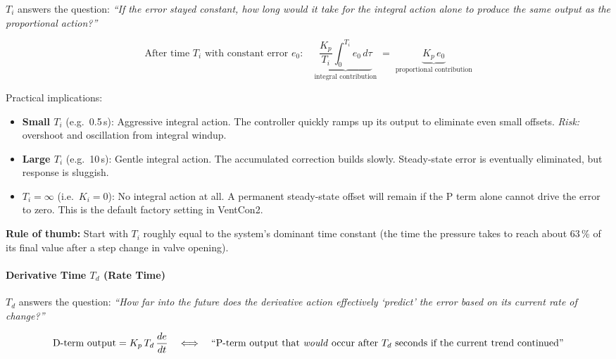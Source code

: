 \documentclass[12pt,a4paper]{article}
\begin{document}
$T_i$ answers the question: \emph{``If the error stayed constant, how long would it take for the integral action alone to produce the same output as the proportional action?''}

\begin{equation}
    \text{After time } T_i \text{ with constant error } e_0: \quad
    \underbrace{\frac{K_p}{T_i}\!\int_0^{T_i} e_0 \, d\tau}_{\text{integral contribution}} \;=\;
    \underbrace{K_p \, e_0}_{\text{proportional contribution}}
\end{equation}

\noindent
Practical implications:
\begin{itemize}
    \item \textbf{Small $T_i$} (e.g.\ 0.5\,s): Aggressive integral action. The controller quickly ramps up its output to eliminate even small offsets. \emph{Risk:} overshoot and oscillation from integral windup.
    \item \textbf{Large $T_i$} (e.g.\ 10\,s): Gentle integral action. The accumulated correction builds slowly. Steady-state error is eventually eliminated, but response is sluggish.
    \item \textbf{$T_i = \infty$} (i.e.\ $K_i = 0$): No integral action at all. A permanent steady-state offset will remain if the P term alone cannot drive the error to zero. This is the default factory setting in VentCon2.
\end{itemize}

\noindent
\textbf{Rule of thumb:} Start with $T_i$ roughly equal to the system's dominant time constant (the time the pressure takes to reach about 63\,\% of its final value after a step change in valve opening).

\paragraph{Derivative Time $T_d$ (Rate Time)}

$T_d$ answers the question: \emph{``How far into the future does the derivative action effectively `predict' the error based on its current rate of change?''}

\begin{equation}
    \text{D-term output} = K_p \, T_d \, \frac{de}{dt}
    \quad\Longleftrightarrow\quad
    \text{``P-term output that \emph{would} occur after } T_d \text{ seconds if the current trend continued''}
\end{equation}
\end{document}
